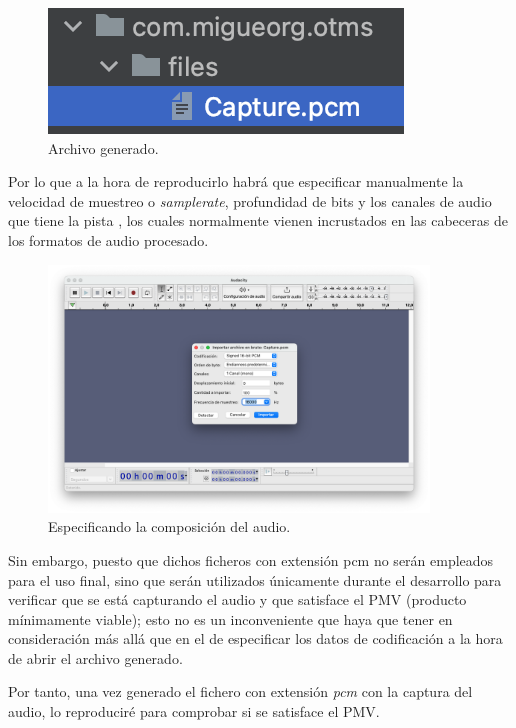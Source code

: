 \begin{figure}[h!]
    \centering
    \includegraphics{fotos/archivo_generado.png}
    \caption{Archivo generado.}
\end{figure}

Por lo que a la hora de reproducirlo habrá que especificar manualmente la
velocidad de muestreo o \emph{samplerate}, profundidad de bits y los canales de
audio que tiene la pista \cite{audio-samplerate}, los cuales normalmente vienen
incrustados en las cabeceras de los formatos de audio procesado.

\begin{figure}[H]
    \centering
    \includegraphics[width=0.9\textwidth]{fotos/importando_datos_en_bruto_audacity.png}
    \caption{Especificando la composición del audio.}
\end{figure}

Sin embargo, puesto que dichos ficheros con extensión pcm no serán empleados para
el uso final, sino que serán utilizados únicamente durante el desarrollo
para verificar que se está capturando el audio y que satisface el PMV (producto
mínimamente viable); esto no es un inconveniente que haya que tener en
consideración más allá que en el de especificar los datos de codificación a la
hora de abrir el archivo generado. 

Por tanto, una vez generado el fichero con
extensión \emph{pcm} con la captura del audio, lo reproduciré para comprobar si
se satisface el PMV. 

